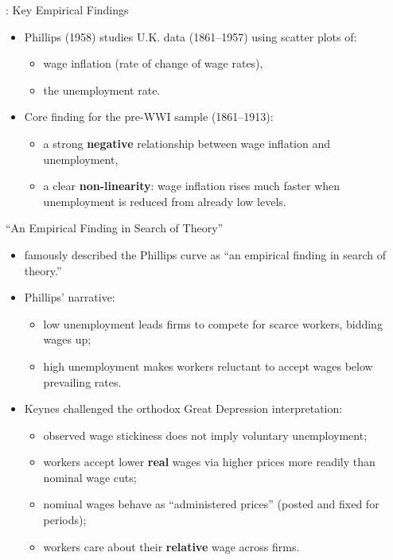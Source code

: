 \documentclass[11pt,aspectratio=169]{beamer}
\begin{document}
\begin{frame}{\textcite{Phillips1958}: Key Empirical Findings}
\small
\begin{itemize}
  \item Phillips (1958) studies U.K. data (1861--1957) using scatter plots of:
  \begin{itemize}
    \item wage inflation (rate of change of wage rates),
    \item the unemployment rate.
  \end{itemize}

  \vspace{0.3em}
  \item Core finding for the pre-WWI sample (1861--1913):
  \begin{itemize}
    \item a strong \textbf{negative} relationship between wage inflation and unemployment,
    \item a clear \textbf{non-linearity}: wage inflation rises much faster when unemployment is reduced from already low levels.
  \end{itemize}
\end{itemize}
\end{frame}

\begin{frame}{\enquote{An Empirical Finding in Search of Theory}}
\small
\begin{itemize}
  \item \textcite{tobin1972} famously described the Phillips curve as \enquote{an empirical finding in search of theory.}
  \item Phillips’ narrative:
  \begin{itemize}
    \item low unemployment leads firms to compete for scarce workers, bidding wages up;
    \item high unemployment makes workers reluctant to accept wages below prevailing rates.
  \end{itemize}
  \item Keynes challenged the orthodox Great Depression interpretation:
  \begin{itemize}
    \item observed wage stickiness does not imply voluntary unemployment;
    \item workers accept lower \textbf{real} wages via higher prices more readily than nominal wage cuts;
    \item nominal wages behave as \enquote{administered prices} (posted and fixed for periods);
    \item workers care about their \textbf{relative} wage across firms.
  \end{itemize}
\end{itemize}
\end{frame}
\end{document}
